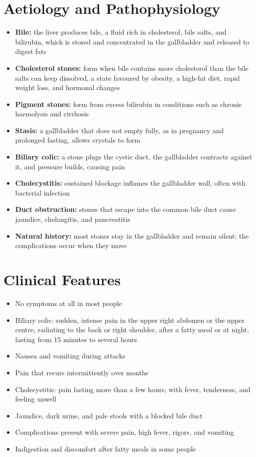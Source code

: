 \section*{Aetiology and Pathophysiology}
\begin{itemize}
    \item \textbf{Bile:} the liver produces bile, a fluid rich in cholesterol, bile salts, and bilirubin, which is stored and concentrated in the gallbladder and released to digest fats
    \item \textbf{Cholesterol stones:} form when bile contains more cholesterol than the bile salts can keep dissolved, a state favoured by obesity, a high-fat diet, rapid weight loss, and hormonal changes
    \item \textbf{Pigment stones:} form from excess bilirubin in conditions such as chronic haemolysis and cirrhosis
    \item \textbf{Stasis:} a gallbladder that does not empty fully, as in pregnancy and prolonged fasting, allows crystals to form
    \item \textbf{Biliary colic:} a stone plugs the cystic duct, the gallbladder contracts against it, and pressure builds, causing pain
    \item \textbf{Cholecystitis:} sustained blockage inflames the gallbladder wall, often with bacterial infection
    \item \textbf{Duct obstruction:} stones that escape into the common bile duct cause jaundice, cholangitis, and pancreatitis
    \item \textbf{Natural history:} most stones stay in the gallbladder and remain silent; the complications occur when they move
\end{itemize}

\section*{Clinical Features}
\begin{itemize}
    \item No symptoms at all in most people
    \item Biliary colic: sudden, intense pain in the upper right abdomen or the upper centre, radiating to the back or right shoulder, after a fatty meal or at night, lasting from 15 minutes to several hours
    \item Nausea and vomiting during attacks
    \item Pain that recurs intermittently over months
    \item Cholecystitis: pain lasting more than a few hours, with fever, tenderness, and feeling unwell
    \item Jaundice, dark urine, and pale stools with a blocked bile duct
    \item Complications present with severe pain, high fever, rigors, and vomiting
    \item Indigestion and discomfort after fatty meals in some people
\end{itemize}

